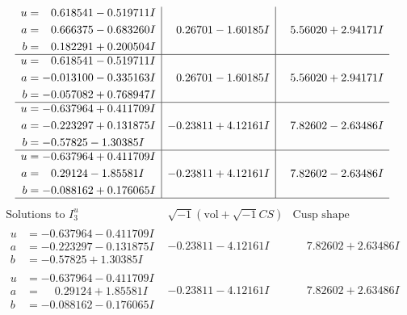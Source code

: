 \documentclass[1p]{elsarticle_modified}
\theoremstyle{definition}
\newcommand{\I}{\sqrt{-1}}
\begin{document}
$$\begin{array}{c|c|c}
\begin{aligned}
u &= \phantom{-}0.618541 - 0.519711 I \\
a &= \phantom{-}0.666375 - 0.683260 I \\
b &= \phantom{-}0.182291 + 0.200504 I\end{aligned}
 & \phantom{-}0.26701 - 1.60185 I & \phantom{-}5.56020 + 2.94171 I \\ \hline\begin{aligned}
u &= \phantom{-}0.618541 - 0.519711 I \\
a &= -0.013100 - 0.335163 I \\
b &= -0.057082 + 0.768947 I\end{aligned}
 & \phantom{-}0.26701 - 1.60185 I & \phantom{-}5.56020 + 2.94171 I \\ \hline\begin{aligned}
u &= -0.637964 + 0.411709 I \\
a &= -0.223297 + 0.131875 I \\
b &= -0.57825 - 1.30385 I\end{aligned}
 & -0.23811 + 4.12161 I & \phantom{-}7.82602 - 2.63486 I \\ \hline\begin{aligned}
u &= -0.637964 + 0.411709 I \\
a &= \phantom{-}0.29124 - 1.85581 I \\
b &= -0.088162 + 0.176065 I\end{aligned}
 & -0.23811 + 4.12161 I & \phantom{-}7.82602 - 2.63486 I\\
 \hline 
 \end{array}$$\newpage$$\begin{array}{c|c|c}  
\text{Solutions to }I^u_{3}& \I (\text{vol} + \sqrt{-1}CS) & \text{Cusp shape}\\
 \hline 
\begin{aligned}
u &= -0.637964 - 0.411709 I \\
a &= -0.223297 - 0.131875 I \\
b &= -0.57825 + 1.30385 I\end{aligned}
 & -0.23811 - 4.12161 I & \phantom{-}7.82602 + 2.63486 I \\ \hline\begin{aligned}
u &= -0.637964 - 0.411709 I \\
a &= \phantom{-}0.29124 + 1.85581 I \\
b &= -0.088162 - 0.176065 I\end{aligned}
 & -0.23811 - 4.12161 I & \phantom{-}7.82602 + 2.63486 I \\ \hline\begin{aligned}

\end{aligned}
\end{array}$$
\end{document}
